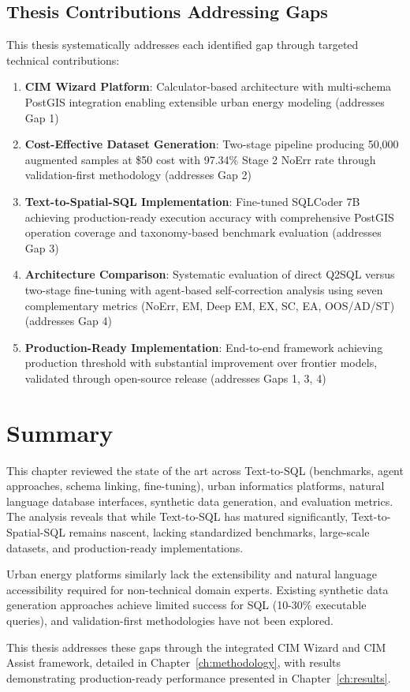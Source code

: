 \subsection{Thesis Contributions Addressing Gaps}

This thesis systematically addresses each identified gap through targeted technical contributions:

\begin{enumerate}[leftmargin=1.2em]
  \item \textbf{CIM Wizard Platform}: Calculator-based architecture with multi-schema PostGIS integration enabling extensible urban energy modeling (addresses Gap 1)
  
  \item \textbf{Cost-Effective Dataset Generation}: Two-stage pipeline producing 50,000 augmented samples at \$50 cost with 97.34\% Stage 2 NoErr rate through validation-first methodology (addresses Gap 2)
  
  \item \textbf{Text-to-Spatial-SQL Implementation}: Fine-tuned SQLCoder 7B achieving production-ready execution accuracy with comprehensive PostGIS operation coverage and taxonomy-based benchmark evaluation (addresses Gap 3)
  
  \item \textbf{Architecture Comparison}: Systematic evaluation of direct Q2SQL versus two-stage fine-tuning with agent-based self-correction analysis using seven complementary metrics (NoErr, EM, Deep EM, EX, SC, EA, OOS/AD/ST) (addresses Gap 4)
  
  \item \textbf{Production-Ready Implementation}: End-to-end framework achieving production threshold with substantial improvement over frontier models, validated through open-source release (addresses Gaps 1, 3, 4)
\end{enumerate}

\section{Summary}

This chapter reviewed the state of the art across Text-to-SQL (benchmarks, agent approaches, schema linking, fine-tuning), urban informatics platforms, natural language database interfaces, synthetic data generation, and evaluation metrics. The analysis reveals that while Text-to-SQL has matured significantly, Text-to-Spatial-SQL remains nascent, lacking standardized benchmarks, large-scale datasets, and production-ready implementations.

Urban energy platforms similarly lack the extensibility and natural language accessibility required for non-technical domain experts. Existing synthetic data generation approaches achieve limited success for SQL (10-30\% executable queries), and validation-first methodologies have not been explored.

This thesis addresses these gaps through the integrated CIM Wizard and CIM Assist framework, detailed in Chapter~\ref{ch:methodology}, with results demonstrating production-ready performance presented in Chapter~\ref{ch:results}.

